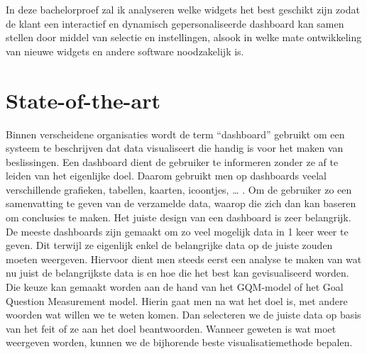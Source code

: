 \documentclass{hogent-article}
\begin{document}
    
    In deze bachelorproef zal ik analyseren welke widgets het best geschikt zijn zodat de klant een  interactief en dynamisch gepersonaliseerde dashboard kan samen stellen door middel van selectie en instellingen, alsook in welke mate ontwikkeling van nieuwe widgets en andere software noodzakelijk is.
    
    
    \section{State-of-the-art}%
    \label{sec:state-of-the-art}
    
    Binnen verscheidene organisaties wordt de term “dashboard” gebruikt om een systeem te beschrijven dat data visualiseert die handig is voor het maken van beslissingen. Een dashboard dient de gebruiker te informeren zonder ze af te leiden van het eigenlijke doel. Daarom gebruikt men op dashboards veelal verschillende grafieken, tabellen, kaarten, icoontjes, … . Om de gebruiker zo een samenvatting te geven van de verzamelde data, waarop die zich dan kan baseren om conclusies te maken. 
    Het juiste design van een dashboard is zeer belangrijk. De meeste dashboards zijn gemaakt om zo veel mogelijk data in 1 keer weer te geven. Dit terwijl ze eigenlijk enkel de belangrijke data op de juiste zouden moeten weergeven. Hiervoor dient men steeds eerst een analyse te maken van wat nu juist de belangrijkste data is en hoe die het best kan gevisualiseerd worden. Die keuze kan gemaakt worden aan de hand van het GQM-model of het Goal Question Measurement model. Hierin gaat men na wat het doel is, met andere woorden wat willen we te weten komen. Dan selecteren we de juiste data op basis van het feit of ze aan het doel beantwoorden. Wanneer geweten is wat moet weergeven worden, kunnen we de bijhorende beste visualisatiemethode bepalen.\autocite{Janes2013}
    
\end{document}
